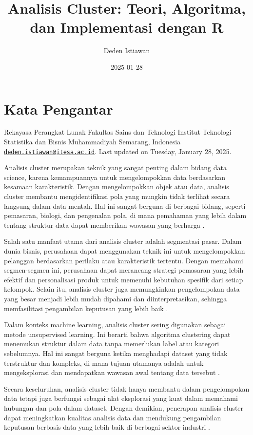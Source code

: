 \documentclass[
  oneside]{book}
\title{Analisis Cluster: Teori, Algoritma, dan Implementasi dengan R}
\author{Deden Istiawan}
\date{2025-01-28}
\begin{document}
\maketitle

{
\setcounter{tocdepth}{1}
\tableofcontents
}
\chapter*{Kata Pengantar}\label{kata-pengantar}

Rekayasa Perangkat Lunak
Fakultas Sains dan Teknologi Institut Teknologi Statistika dan
Bisnis Muhammadiyah Semarang, Indonesia
\href{mailto:deden.istiawan@itesa.ac.id}{\nolinkurl{deden.istiawan@itesa.ac.id}}.
Last updated on Tuesday, January 28, 2025.

Analisis cluster merupakan teknik yang sangat penting dalam bidang data
science, karena kemampuannya untuk mengelompokkan data berdasarkan
kesamaan karakteristik. Dengan mengelompokkan objek atau data, analisis
cluster membantu mengidentifikasi pola yang mungkin tidak terlihat
secara langsung dalam data mentah. Hal ini sangat berguna di berbagai
bidang, seperti pemasaran, biologi, dan pengenalan pola, di mana
pemahaman yang lebih dalam tentang struktur data dapat memberikan
wawasan yang berharga \citep{kaufman:clustering1990}.

Salah satu manfaat utama dari analisis cluster adalah segmentasi pasar.
Dalam dunia bisnis, perusahaan dapat menggunakan teknik ini untuk
mengelompokkan pelanggan berdasarkan perilaku atau karakteristik
tertentu. Dengan memahami segmen-segmen ini, perusahaan dapat merancang
strategi pemasaran yang lebih efektif dan personalisasi produk untuk
memenuhi kebutuhan spesifik dari setiap kelompok. Selain itu, analisis
cluster juga memungkinkan pengelompokan data yang besar menjadi lebih
mudah dipahami dan diinterpretasikan, sehingga memfasilitasi pengambilan
keputusan yang lebih baik \citep{han2012mining}.

Dalam konteks machine learning, analisis cluster sering digunakan
sebagai metode unsupervised learning. Ini berarti bahwa algoritma
clustering dapat menemukan struktur dalam data tanpa memerlukan label
atau kategori sebelumnya. Hal ini sangat berguna ketika menghadapi
dataset yang tidak terstruktur dan kompleks, di mana tujuan utamanya
adalah untuk mengeksplorasi dan mendapatkan wawasan awal tentang data
tersebut \citep{jain2010}.

Secara keseluruhan, analisis cluster tidak hanya membantu dalam
pengelompokan data tetapi juga berfungsi sebagai alat eksplorasi yang
kuat dalam memahami hubungan dan pola dalam dataset. Dengan demikian,
penerapan analisis cluster dapat meningkatkan kualitas analisis data dan
mendukung pengambilan keputusan berbasis data yang lebih baik di
berbagai sektor industri .
\end{document}
